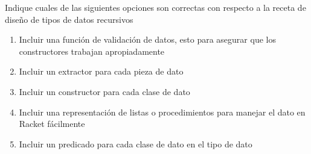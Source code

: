 {
Indique cuales de las siguientes opciones son correctas con respecto a la receta de diseño de tipos de datos recursivos
	\begin{enumerate}
		\item Incluir una función de validación de datos, esto para asegurar que los constructores trabajan apropiadamente 
		\item Incluir un extractor para cada pieza de dato %
		\item Incluir un constructor para cada clase de dato %
		\item Incluir una representación de listas o procedimientos para manejar el dato en Racket fácilmente
		\item Incluir un predicado para cada clase de dato en el tipo de dato %
  \end{enumerate}
}
